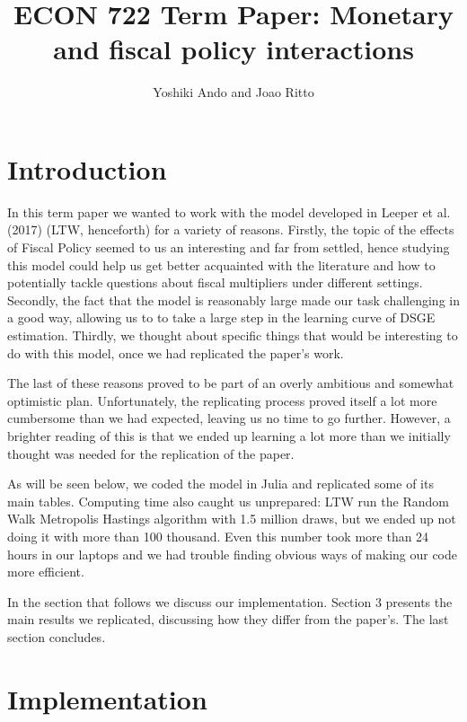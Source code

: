 \documentclass[letterpaper,12pt]{article}%
\begin{document}
\title{ECON 722 Term Paper: Monetary and fiscal policy interactions}
\author{Yoshiki Ando and Joao Ritto}
\maketitle

\section{Introduction}

In this term paper we wanted to work with the model developed in Leeper et al. (2017) (LTW, henceforth) for a variety of reasons. Firstly, the topic of the effects of Fiscal Policy seemed to us an interesting and far from settled, hence studying this model could help us get better acquainted with the literature and how to potentially tackle questions about fiscal multipliers under different settings. Secondly, the fact that the model is reasonably large made our task challenging in a good way, allowing us to to take a large step in the learning curve of DSGE estimation. Thirdly, we thought about specific things that would be interesting to do with this model, once we had replicated the paper's work.

The last of these reasons proved to be part of an overly ambitious and somewhat optimistic plan. Unfortunately, the replicating process proved itself a lot more cumbersome than we had expected, leaving us no time to go further. However, a brighter reading of this is that we ended up learning a lot more than we initially thought was needed for the replication of the paper.

As will be seen below, we coded the model in Julia and replicated some of its main tables. Computing time also caught us unprepared: LTW run the Random Walk Metropolis Hastings algorithm with 1.5 million draws, but we ended up not doing it with more than 100 thousand. Even this number took more than 24 hours in our laptops and we had trouble finding obvious ways of making our code more efficient.

In the section that follows we discuss our implementation. Section 3 presents the main results we replicated, discussing how they differ from the paper's. The last section concludes.

\section{Implementation}
\end{document}
